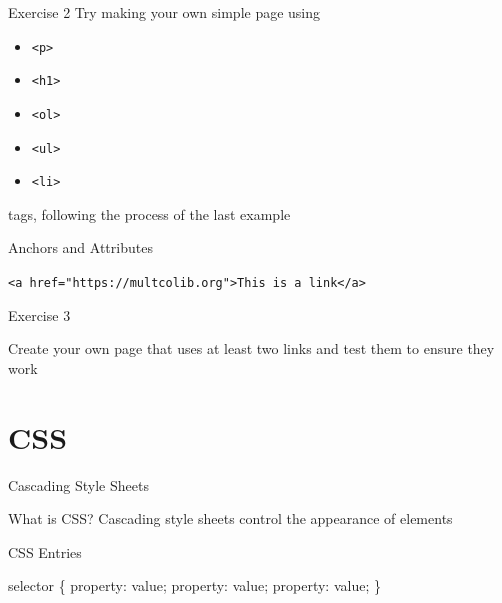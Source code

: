 \documentclass{beamer}
\begin{document}
\begin{frame}[fragile]
  \begin{block}{Exercise 2}
    Try making your own simple page using
    \begin{itemize}
      \item \Verb"<p>"
      \item \Verb"<h1>"
      \item \Verb"<ol>"
      \item \Verb"<ul>"
      \item \Verb"<li>"
    \end{itemize}
    tags, following the process of the last example
  \end{block}
\end{frame}

\begin{frame}[fragile]{Anchors and Attributes}
 \begin{block}{}
   \texttt{<a href="https://multcolib.org">This is a link</a>}
 \end{block}
\end{frame}

\begin{frame}{Exercise 3}
  \begin{block}{}
    {\Large
      Create your own page that uses at least two links and test them to ensure they work
    }
  \end{block}
\end{frame}

\section{CSS}

\begin{frame}{Cascading Style Sheets}
  \begin{block}{What is CSS?}
    Cascading style sheets control the appearance of elements
  \end{block}
\end{frame}

\begin{frame}[fragile]{CSS Entries}
  \begin{block}{}
    \begin{semiverbatim}
selector \{
    property: value;
    property: value;
    property: value;
\}
     \end{semiverbatim}
   \end{block}
\end{frame}
\end{document}
